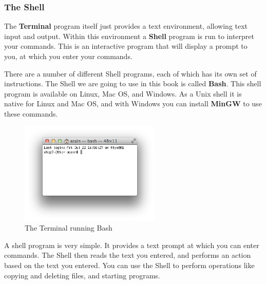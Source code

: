 \clearpage
\subsubsection{The Shell} %
\label{ssub:the_shell}

The \textbf{Terminal} program itself just provides a text environment, allowing text input and output. Within this environment a \textbf{Shell} program is run to interpret your commands. This is an interactive program that will display a prompt to you, at which you enter your commands.

There are a number of different Shell programs, each of which has its own set of instructions. The Shell we are going to use in this book is called \textbf{Bash}. This shell program is available on Linux, Mac OS, and Windows. As a Unix shell it is native for Linux and Mac OS, and with Windows you can install \textbf{MinGW} to use these commands.

\begin{figure}[h]
   \centering
   \includegraphics[width=0.6\textwidth]{./topics/programs-and-compilers/images/Bash} 
   \caption{The Terminal running Bash}
   \label{fig:bash}
\end{figure}

A shell program is very simple. It provides a text prompt at which you can enter commands. The Shell then reads the text you entered, and performs an action based on the text you entered. You can use the Shell to perform operations like copying and deleting files, and starting programs.


